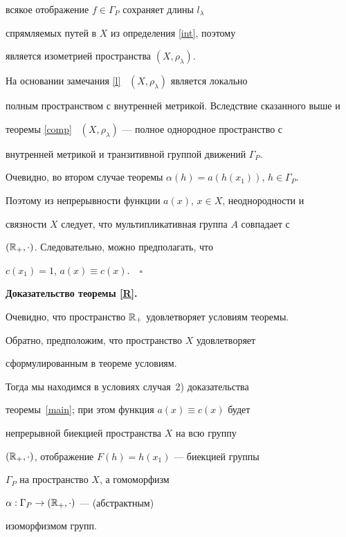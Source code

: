 всякое отображение $f \in \Gamma_{P}$ сохраняет длины $l_{\lambda}$


спрямляемых путей в $X$ из определения \ref{int}, поэтому


является изометрией пространства $(X,\rho_{\lambda})$.


На основании замечания \ref{l} \ $(X,\rho_{\lambda})$ является локально


полным пространством с внутренней метрикой. Вследствие сказанного выше и


теоремы \ref{comp} \ $(X,\rho_{\lambda})$ --- полное однородное пространство с


внутренней метрикой и транзитивной группой движений $\Gamma_{P}$.





Очевидно, во втором случае теоремы $\alpha(h)=a(h(x_{1}))$, $h \in \Gamma_{P}$.


Поэтому из непрерывности функции $a(x)$, $x \in X$, неоднородности и


связности $X$ следует, что мультипликативная группа $A$ совпадает с


$(\Bbb{R}_{+},\cdot)$. Следовательно, можно предполагать, что


$c(x_{1})=1$, $a(x) \equiv c(x)$.$\quad\square$


\medskip





{\bf Доказательство теоремы \ref{R}.}


Очевидно, что пространство $\Bbb R_+$ удовлетворяет условиям теоремы.





Обратно, предположим, что пространство $X$ удовлетворяет


сформулированным в теореме условиям.


Тогда мы находимся в условиях случая~2) доказательства


теоремы~\ref{main}; при этом функция $a(x) \equiv c(x)$ будет 


непрерывной биекцией пространства $X$ на всю группу


$(\Bbb{R}_{+},\cdot)$, отображение $F(h)=h(x_{1})$ --- биекцией группы


$\Gamma_{P}$ на пространство $X$, а гомоморфизм


$\alpha: \Gamma_{P} \rightarrow (\Bbb{R}_{+},\cdot)$ --- (абстрактным)


изоморфизмом групп.





